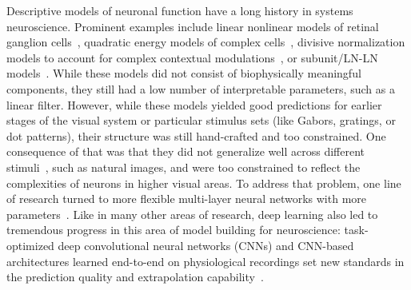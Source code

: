 \documentclass[B2,COG]{ercgrant}
\begin{document}
Descriptive models of neuronal function have a long history in systems neuroscience.
Prominent examples include linear nonlinear models of retinal ganglion cells~\parencite{Paninski2004-ax,Pillow2008-me}, quadratic energy models of complex cells~\parencite{Adelson1985-re}, divisive normalization models to account for complex contextual modulations~\parencite{Heeger1992-xx}, or subunit/LN-LN models~\parencite{Rust2005-ro,Touryan2005-pi,Vintch2015-gc}.
While these models did not consist of biophysically meaningful components, they still had a low number of interpretable parameters, such as a linear filter. 
However, while these models yielded good predictions for earlier stages of the visual system or particular stimulus sets (like Gabors, gratings, or dot patterns), their structure was still hand-crafted and too constrained. 
One consequence of that was that they did not generalize well across different stimuli~\parencite{Fournier2011-pl}, such as natural images, and were too constrained to reflect the complexities of neurons in higher visual areas.
To address that problem, one line of research  turned to more flexible multi-layer neural networks with more parameters~\parencite{Zipser1988-nh,Lehky1992-wf,Lau2002-gb,Prenger2004-qu}.
Like in many other areas of research, deep learning also led to tremendous progress in this area of model building for neuroscience: task-optimized deep convolutional neural networks (CNNs) \parencite{Yamins2014-cg,Cadieu2014-gc,Cadena2017-rb} and CNN-based architectures learned end-to-end on physiological recordings set new standards in the prediction quality and extrapolation capability~\parencite{Antolik2016-va,Batty2016-do,McIntosh2016-tr,Klindt2017-sb,Kindel2017-xs,Cadena2017-rb,Burg2021-yg, Lurz2020-ua, Bashiri2021-or,Zhang2018-cs,Cowley2020-cy,Ecker2018-gz, Sinz2018-sk, Walker2019-yw, Franke2022-do}. 
\end{document}
